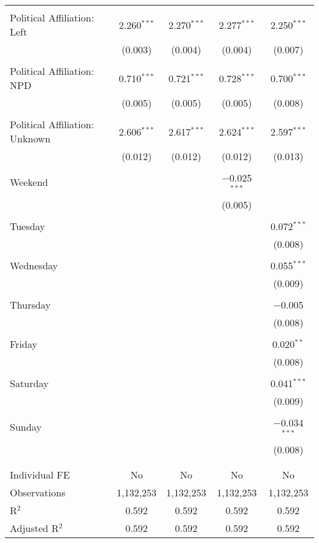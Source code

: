\documentclass[
]{article}
\begin{document}
\begin{table}[!htbp]
{\begin{tabular}{@{\extracolsep{5pt}}lcccc}
  & & & & \\ 
 Political Affiliation: Left & 2.260$^{***}$ & 2.270$^{***}$ & 2.277$^{***}$ & 2.250$^{***}$ \\ 
  & (0.003) & (0.004) & (0.004) & (0.007) \\ 
  & & & & \\ 
 Political Affiliation: NPD & 0.710$^{***}$ & 0.721$^{***}$ & 0.728$^{***}$ & 0.700$^{***}$ \\ 
  & (0.005) & (0.005) & (0.005) & (0.008) \\ 
  & & & & \\ 
 Political Affiliation: Unknown & 2.606$^{***}$ & 2.617$^{***}$ & 2.624$^{***}$ & 2.597$^{***}$ \\ 
  & (0.012) & (0.012) & (0.012) & (0.013) \\ 
  & & & & \\ 
 Weekend &  &  & $-$0.025$^{***}$ &  \\ 
  &  &  & (0.005) &  \\ 
  & & & & \\ 
 Tuesday &  &  &  & 0.072$^{***}$ \\ 
  &  &  &  & (0.008) \\ 
  & & & & \\ 
 Wednesday &  &  &  & 0.055$^{***}$ \\ 
  &  &  &  & (0.009) \\ 
  & & & & \\ 
 Thursday &  &  &  & $-$0.005 \\ 
  &  &  &  & (0.008) \\ 
  & & & & \\ 
 Friday &  &  &  & 0.020$^{**}$ \\ 
  &  &  &  & (0.008) \\ 
  & & & & \\ 
 Saturday &  &  &  & 0.041$^{***}$ \\ 
  &  &  &  & (0.009) \\ 
  & & & & \\ 
 Sunday &  &  &  & $-$0.034$^{***}$ \\ 
  &  &  &  & (0.008) \\ 
  & & & & \\ 
\hline \\[-1.8ex] 
Individual FE & No & No & No & No \\ 
Observations & 1,132,253 & 1,132,253 & 1,132,253 & 1,132,253 \\ 
R$^{2}$ & 0.592 & 0.592 & 0.592 & 0.592 \\ 
Adjusted R$^{2}$ & 0.592 & 0.592 & 0.592 & 0.592 \\ 

\end{tabular}}
\end{table}
\end{document}
